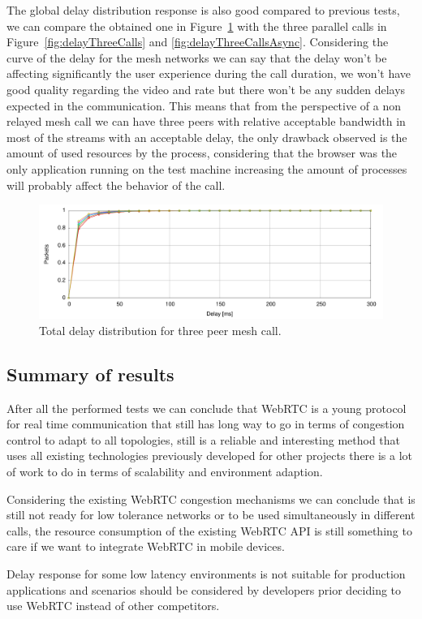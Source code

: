 The global delay distribution response is also good compared to previous tests, we can compare the obtained one in Figure~\ref{fig:delayThreeMesh} with the three parallel calls in Figure~\ref{fig:delayThreeCalls} and \ref{fig:delayThreeCallsAsync}. Considering the curve of the delay for the mesh networks we can say that the delay won't be affecting significantly the user experience during the call duration, we won't have good quality regarding the video and rate but there won't be any sudden delays expected in the communication. This means that from the perspective of a non relayed mesh call we can have three peers with relative acceptable bandwidth in most of the streams with an acceptable delay, the only drawback observed is the amount of used resources by the process, considering that the browser was the only application running on the test machine increasing the amount of processes will probably affect the behavior of the call.

\begin{figure}[h]
  \centering
    \includegraphics[width=1\textwidth]{./figures/mesh_total_delay_distribution.pdf}
      \caption[Total delay distribution for three peer mesh call]{Total delay distribution for three peer mesh call.}
	\label{fig:delayThreeMesh}
\end{figure}

\subsection{Summary of results}

After all the performed tests we can conclude that WebRTC is a young protocol for real time communication that still has long way to go in terms of congestion control to adapt to all topologies, still is a reliable and interesting method that uses all existing technologies previously developed for other projects there is a lot of work to do in terms of scalability and environment adaption. 

Considering the existing WebRTC congestion mechanisms we can conclude that is still not ready for low tolerance networks or to be used simultaneously in different calls, the resource consumption of the existing WebRTC API is still something to care if we want to integrate WebRTC in mobile devices.

Delay response for some low latency environments is not suitable for production applications and scenarios should be considered  by developers prior deciding to use WebRTC instead of other competitors.